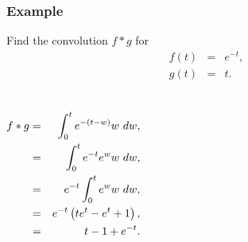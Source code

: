 \begin{frame}
  \frametitle{Example}

  Find the convolution $f*g$ for 
  \begin{eqnarray*}
    f(t) & = & e^{-t}, \\
    g(t) & = & t.
  \end{eqnarray*}


  {%

    \begin{columns}
      \begin{eqnarray*}
        f*g & = & \int^t_0 e^{-(t-w)} w ~ dw, \\
        & = & \int^t_0 e^{-t} e^{w} w ~ dw, \\
        & = & e^{-t} \int^t_0 e^{w} w ~ dw, \\
        & = & e^{-t} \left( t e^t - e^t + 1 \right), \\
        & = & t - 1 + e^{-t}.
      \end{eqnarray*}

    \end{columns}

  }

\end{frame}



